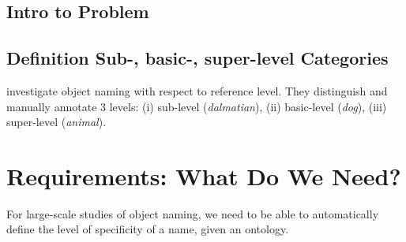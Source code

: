 

\cite{graf2016animal}
\cite{Rosch1978}
\subsection{Intro to Problem}

\subsection{Definition Sub-, basic-, super-level Categories}
\cite{graf2016animal} investigate object naming with respect to reference level. They distinguish and manually annotate 3 levels: (i) sub-level (\textit{dalmatian}), (ii) basic-level (\textit{dog}), (iii) super-level (\textit{animal}).

\section{Requirements: What Do We Need? }
For large-scale studies of object naming, we need to be able to automatically define the level of specificity of a name, given an ontology. 